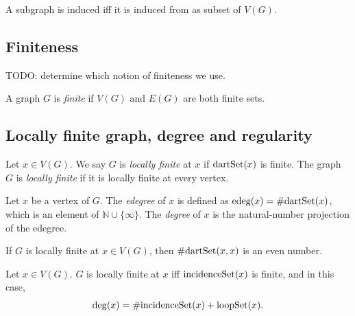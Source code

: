 \begin{lemma}
  \label{lem:induced_iff_isinduced}
  A subgraph is induced iff it is induced from as subset of $V(G)$.
\end{lemma}

\subsection{Finiteness}

TODO: determine which notion of finiteness we use.

\begin{definition}
  \label{def:finite}
  A graph $G$ is \emph{finite} if $V(G)$ and $E(G)$ are both finite sets.
\end{definition}


\subsection{Locally finite graph, degree and regularity}

\begin{definition}
  \label{def:locally_finite}
    \leanok
  Let $x \in V(G)$.
  We say $G$ is \emph{locally finite} at $x$ if $\mathrm{dartSet} (x)$ is finite.
  The graph $G$ is \emph{locally finite} if it is locally finite at every vertex.
\end{definition}

\begin{definition}
  \label{def:degree}
  \leanok
  Let $x$ be a vertex of $G$.
  The \emph{edegree} of $x$ is defined as $\mathrm{edeg}(x) = \# \mathrm{dartSet}(x)$, which is
  an element of $\mathbb{N} \cup \{ \infty\}$.
  The \emph{degree} of $x$ is the natural-number projection of the edegree.
\end{definition}

\begin{lemma}
  \label{lem:darset_loop_even}
  If $G$ is locally finite at $x \in V(G)$, then
   $\# \mathrm{dartSet}(x,x)$ is an even number.
\end{lemma}

\begin{lemma}
  \label{lem:degree_inc_loop}
  Let $x \in V(G)$.
  $G$ is locally finite at $x$ iff $\mathrm{incidenceSet}(x)$ is finite, and in this case,
  \begin{equation*}
    \deg(x) = \# \mathrm{incidenceSet}(x) + \mathrm{loopSet}(x).
  \end{equation*}
\end{lemma}

